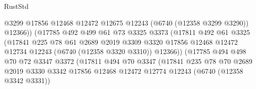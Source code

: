 \begin{lexlean}{RustStd}
\begin{coremodule}
                                    @3299
                                    @17856
                                    @12468
                                    @12472
                                    @12675
                                    @12243
                                    (@6740 (@12358 @3299 @3290))
                                    @12366))
                                (@17785
                                  @492
                                  @499
                                  @61
                                  @73
                                  @3325
                                  @3373
                                  (@17811
                                    @492
                                    @61
                                    @3325
                                    (@17841
                                      @225
                                      @78
                                      @61
                                      @2689
                                      @2019
                                      @3309
                                      @3320
                                      @17856
                                      @12468
                                      @12472
                                      @12734
                                      @12243
                                      (@6740 (@12358 @3320 @3310))
                                      @12366))
                                  (@17785
                                    @494
                                    @498
                                    @70
                                    @72
                                    @3347
                                    @3372
                                    (@17811
                                      @494
                                      @70
                                      @3347
                                      (@17841
                                        @235
                                        @78
                                        @70
                                        @2689
                                        @2019
                                        @3330
                                        @3342
                                        @17856
                                        @12468
                                        @12472
                                        @12774
                                        @12243
                                        (@6740 (@12358 @3342 @3331))

\end{coremodule}
\end{lexlean}
